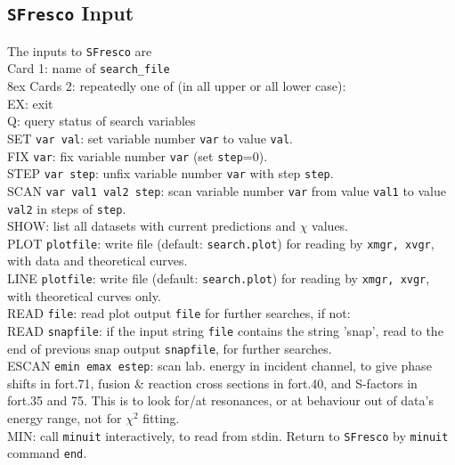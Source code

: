 \documentclass[11pt]{article}
\begin{document}
\subsection*{{\tt SFresco} Input}
The inputs to {\tt SFresco} are\\
Card 1: name of {\tt search\_file}\\

\hangindent 8ex
Cards 2: repeatedly one of (in all upper or all lower case):
\\ EX: exit
\\ Q: query status of search variables
\\ SET {\tt var val}: set variable number {\tt var} to value {\tt val}.
\\ FIX {\tt var}: fix variable number {\tt var} (set {\tt step}=0).
\\ STEP {\tt var step}: unfix variable number {\tt var} with step {\tt step}.
\\ SCAN {\tt var val1 val2 step}: scan variable number {\tt var}
from value {\tt val1} to value {\tt val2} in steps of {\tt step}.
\\ SHOW: list all datasets with current predictions and $\chi$ values.
\\ PLOT {\tt plotfile}: write file (default: {\tt search.plot}) for reading by {\tt xmgr, xvgr},
 with data and theoretical curves.
\\ LINE {\tt plotfile}: write file (default: {\tt search.plot}) for reading by {\tt xmgr, xvgr},
 with theoretical curves only.
\\ READ {\tt file}: read plot output {\tt file} for further searches, if not:
\\ READ {\tt snapfile}: if the input string {\tt file} contains the string 'snap',
read to the end of previous snap output {\tt snapfile}, for further searches.
\\ ESCAN {\tt emin emax estep}: scan lab. energy in incident channel, to give
phase shifts in fort.71, fusion \& reaction cross sections in fort.40,
 and S-factors in fort.35 and 75.
This is to look for/at resonances, or at behaviour out of data's energy range,
not for $\chi^2$ fitting.
\\ MIN: call {\tt minuit} interactively, to read from stdin.
Return to {\tt SFresco} by {\tt minuit} command {\tt end}.
\end{document}
